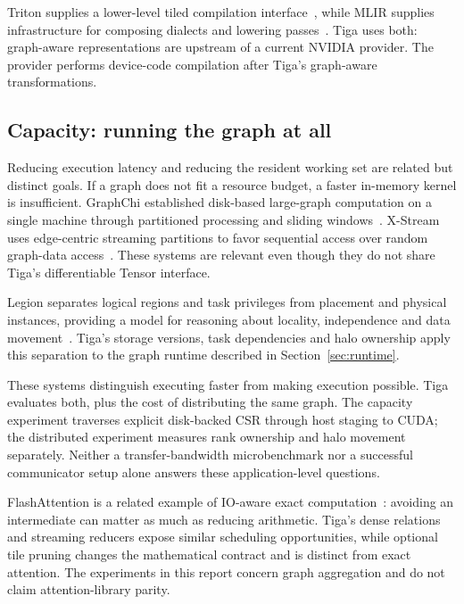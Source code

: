 Triton supplies a lower-level tiled compilation interface~\cite{triton}, while
MLIR supplies infrastructure for composing dialects and lowering passes~\cite{mlir}.
Tiga uses both: graph-aware representations are upstream of a current NVIDIA
provider. The provider performs device-code compilation after Tiga's graph-aware
transformations.

\subsection{Capacity: running the graph at all}
Reducing execution latency and reducing the resident working set are related but
distinct goals. If a graph does not fit a resource budget, a faster in-memory
kernel is insufficient. GraphChi established disk-based large-graph computation
on a single machine through partitioned processing and sliding
windows~\cite{graphchi}. X-Stream uses edge-centric streaming partitions to favor
sequential access over random graph-data access~\cite{xstream}. These systems are
relevant even though they do not share Tiga's differentiable Tensor interface.

Legion separates logical regions and task privileges from placement and physical
instances, providing a model for reasoning about locality, independence and
data movement~\cite{legion}. Tiga's storage versions, task dependencies and halo
ownership apply this separation to the graph runtime described in Section~\ref{sec:runtime}.

These systems distinguish executing faster from making execution possible.
Tiga evaluates both, plus the cost of distributing the same graph. The capacity
experiment traverses explicit disk-backed CSR through host staging to CUDA;
the distributed experiment measures rank ownership and halo movement separately.
Neither a transfer-bandwidth microbenchmark nor a successful communicator setup
alone answers these application-level questions.

FlashAttention is a related example of IO-aware exact
computation~\cite{flashattention}: avoiding an intermediate can matter as much as
reducing arithmetic. Tiga's dense relations and streaming reducers expose
similar scheduling opportunities, while optional tile pruning changes the
mathematical contract and is distinct from exact attention. The experiments in
this report concern graph aggregation and do not claim attention-library parity.

